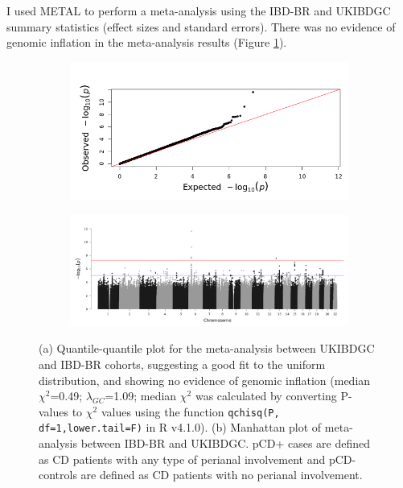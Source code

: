 I used METAL to perform a meta-analysis using the IBD-BR  and UKIBDGC summary statistics (effect sizes and standard errors). There was no evidence of genomic inflation in the meta-analysis results (Figure \ref{fig:meta_qq_manhattan}). 
\begin{figure}[H] 
  \centering   
  \begin{subfigure}[t]{1.0\textwidth}
    \centering   

    \includegraphics[width=1.0\textwidth]{Vector/ukibdgc_ibdbr_perianal_timesincediag5yrsctrl_allcase_meta_qq}

    
  \end{subfigure} 

    \begin{subfigure}[t]{1.0\textwidth}
      \centering   

      \includegraphics[width=1.0\textwidth]{Vector/ukibdgc_ibdbr_perianal_timesincediag5yrsctrl_allcase_meta}

      
  \end{subfigure} 
  \caption[Figure]{(a) Quantile-quantile plot for the meta-analysis between UKIBDGC and IBD-BR cohorts, suggesting a good fit to the uniform distribution, and showing no evidence of genomic inflation (median $\chi^{2}$=0.49; $\lambda_{GC}$=1.09; median $\chi^{2}$ was calculated by converting P-values to $\chi^{2}$  values using the function \Verb+qchisq(P, df=1,lower.tail=F)+ in R v4.1.0). (b) Manhattan plot of meta-analysis between IBD-BR and UKIBDGC. pCD+ cases are defined as CD patients with any type of perianal involvement and pCD- controls are defined as CD patients with no perianal involvement.}
  \label{fig:meta_qq_manhattan}
  \end{figure}
